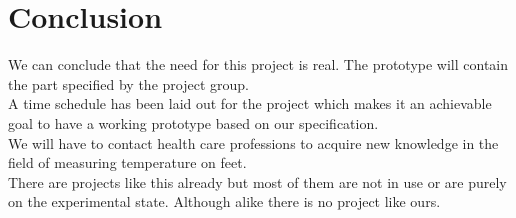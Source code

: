 \chapter{Conclusion}
We can conclude that the need for this project is real. The prototype will contain the part specified by the project group.\\
A time schedule has been laid out for the project which makes it an achievable goal to have a working prototype based on our specification.\\
We will have to contact health care professions to acquire new knowledge in the field of measuring temperature on feet.\\
There are projects like this already but most of them are not in use or are purely on the experimental state. Although alike there is no project like ours.\\





